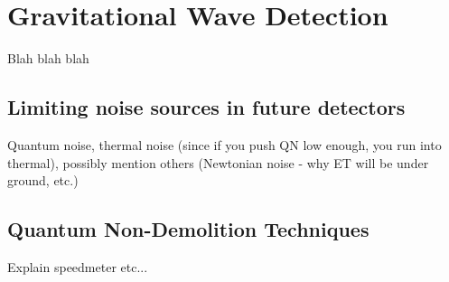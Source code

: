 \chapter{Gravitational Wave Detection}
\label{c:gw-detection}

Blah blah blah

\section{Limiting noise sources in future detectors}
Quantum noise, thermal noise (since if you push QN low enough, you run into thermal), possibly mention others (Newtonian noise - why ET will be under ground, etc.)

\section{Quantum Non-Demolition Techniques}
Explain speedmeter etc...